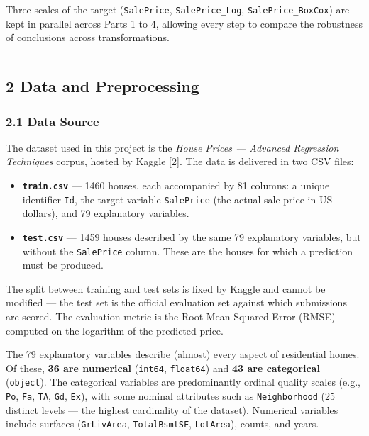 Three scales of the target (\texttt{SalePrice}, \texttt{SalePrice\_Log},
\texttt{SalePrice\_BoxCox}) are kept in parallel across Parts 1 to 4,
allowing every step to compare the robustness of conclusions across
transformations.

\begin{center}\rule{0.5\linewidth}{0.5pt}\end{center}

\subsection{2 Data and Preprocessing}\label{data-and-preprocessing}

\subsubsection{2.1 Data Source}\label{data-source}

The dataset used in this project is the \emph{House Prices --- Advanced
Regression Techniques} corpus, hosted by Kaggle {[}2{]}. The data is
delivered in two CSV files:

\begin{itemize}
\tightlist
\item
  \textbf{\texttt{train.csv}} --- 1460 houses, each accompanied by 81
  columns: a unique identifier \texttt{Id}, the target variable
  \texttt{SalePrice} (the actual sale price in US dollars), and 79
  explanatory variables.
\item
  \textbf{\texttt{test.csv}} --- 1459 houses described by the same 79
  explanatory variables, but without the \texttt{SalePrice} column.
  These are the houses for which a prediction must be produced.
\end{itemize}

The split between training and test sets is fixed by Kaggle and cannot
be modified --- the test set is the official evaluation set against
which submissions are scored. The evaluation metric is the Root Mean
Squared Error (RMSE) computed on the logarithm of the predicted price.

The 79 explanatory variables describe (almost) every aspect of
residential homes. Of these, \textbf{36 are numerical} (\texttt{int64},
\texttt{float64}) and \textbf{43 are categorical} (\texttt{object}). The
categorical variables are predominantly ordinal quality scales (e.g.,
\texttt{Po}, \texttt{Fa}, \texttt{TA}, \texttt{Gd}, \texttt{Ex}), with
some nominal attributes such as \texttt{Neighborhood} (25 distinct
levels --- the highest cardinality of the dataset). Numerical variables
include surfaces (\texttt{GrLivArea}, \texttt{TotalBsmtSF},
\texttt{LotArea}), counts, and years.

